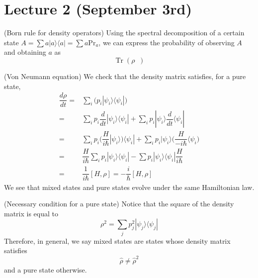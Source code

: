 \section{Lecture 2 (September 3rd)}
\begin{thm}
(Born rule for density operators) Using the spectral decomposition of a certain state ${A}=\sum a|a\rangle \langle a|=\sum a\mathrm{Pr}_{a}$, we can express the probability of observing ${A}$ and obtaining $a$ as 
\[\mathop{\mathrm{Tr}}({\rho }\mathop{\mathrm{Pr}_{a}})\]
\end{thm}
\vspace{2ex}
\begin{thm}
(Von Neumann equation) We check that the density matrix satisfies, for a pure state,
\[\begin{align*}
\dfrac{d \rho }{d t}=&\sum _{i}\Big(p_{i}|\psi _{i}\rangle \langle \psi _{i}|\Big)\\
=&\sum _{i}p_{i}\dfrac{d }{d t}|\psi _{i}\rangle \langle \psi _{i} |+\sum _{i}p_{i}|\psi _{i}\rangle \dfrac{d }{d t}\langle \psi_{i}|\\
=&\sum _{i}p_{i}\Big(\dfrac{H}{i\hbar }|\psi _{i}\rangle \Big)\langle \psi _{i}|+\sum _{i}p_{i}|\psi _{i}\rangle \Big(\dfrac{H}{-i\hbar }\langle \psi _{i}\Big)\\
=&\dfrac{H}{i\hbar }\sum _{i}p_{i}|\psi _{i}\rangle \langle \psi _{i}|-\sum p_{i}|\psi _{i}\rangle \langle \psi _{i}|\dfrac{H}{i\hbar }\\
=&\dfrac{1}{i\hbar }[H,\rho ]=-\dfrac{i}{\hbar }[H,\rho ]
\end{align*}\]
We see that mixed states and pure states evolve under the same Hamiltonian law.
\end{thm}
\vspace{2ex}
\begin{rmk}
(Necessary condition for a pure state) Notice that the square of the density matrix is equal to
\[{\rho }^2=\sum _{j}p_{j}^2|\psi _{j}\rangle \langle \psi _{j}|\]
Therefore, in general, we say mixed states are states whose density matrix satisfies
\[\hat{\rho }\ne \hat{\rho }^2\]
and a pure state otherwise.
\end{rmk}
\vspace{2ex}
